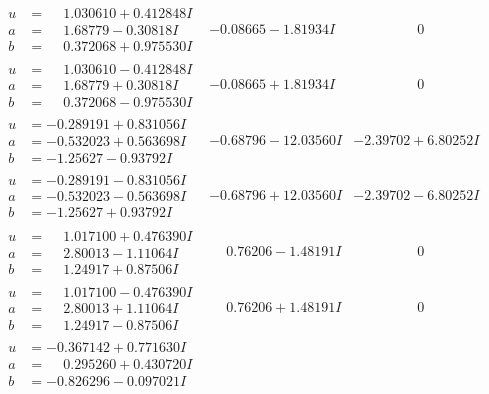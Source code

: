 \documentclass[1p]{elsarticle_modified}
\theoremstyle{definition}
\begin{document}
$$\begin{array}{c|c|c}
\begin{aligned}
u &= \phantom{-}1.030610 + 0.412848 I \\
a &= \phantom{-}1.68779 - 0.30818 I \\
b &= \phantom{-}0.372068 + 0.975530 I\end{aligned}
 & -0.08665 - 1.81934 I & \phantom{-0.000000 } 0 \\ \hline\begin{aligned}
u &= \phantom{-}1.030610 - 0.412848 I \\
a &= \phantom{-}1.68779 + 0.30818 I \\
b &= \phantom{-}0.372068 - 0.975530 I\end{aligned}
 & -0.08665 + 1.81934 I & \phantom{-0.000000 } 0 \\ \hline\begin{aligned}
u &= -0.289191 + 0.831056 I \\
a &= -0.532023 + 0.563698 I \\
b &= -1.25627 - 0.93792 I\end{aligned}
 & -0.68796 - 12.03560 I & -2.39702 + 6.80252 I \\ \hline\begin{aligned}
u &= -0.289191 - 0.831056 I \\
a &= -0.532023 - 0.563698 I \\
b &= -1.25627 + 0.93792 I\end{aligned}
 & -0.68796 + 12.03560 I & -2.39702 - 6.80252 I \\ \hline\begin{aligned}
u &= \phantom{-}1.017100 + 0.476390 I \\
a &= \phantom{-}2.80013 - 1.11064 I \\
b &= \phantom{-}1.24917 + 0.87506 I\end{aligned}
 & \phantom{-}0.76206 - 1.48191 I & \phantom{-0.000000 } 0 \\ \hline\begin{aligned}
u &= \phantom{-}1.017100 - 0.476390 I \\
a &= \phantom{-}2.80013 + 1.11064 I \\
b &= \phantom{-}1.24917 - 0.87506 I\end{aligned}
 & \phantom{-}0.76206 + 1.48191 I & \phantom{-0.000000 } 0 \\ \hline\begin{aligned}
u &= -0.367142 + 0.771630 I \\
a &= \phantom{-}0.295260 + 0.430720 I \\
b &= -0.826296 - 0.097021 I\end{aligned}

\end{array}$$
\end{document}
